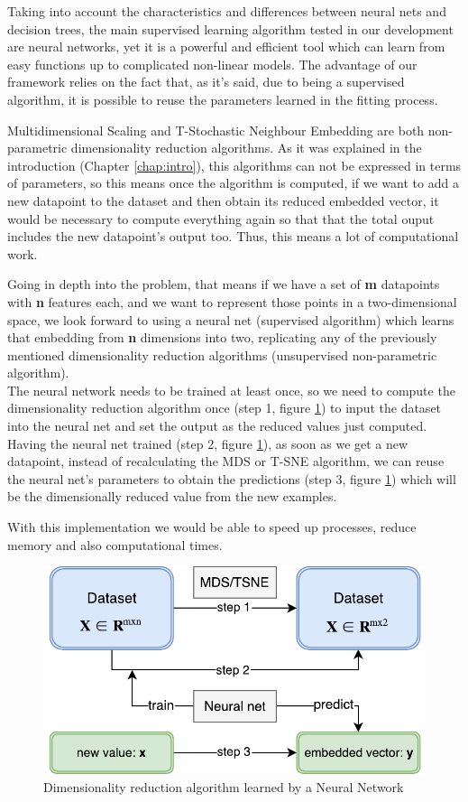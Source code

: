\documentclass[a4paper,11pt,spanish]{report}
\begin{document}
Taking into account the characteristics and differences between neural nets and decision trees, the main supervised learning algorithm tested in our development are neural networks, yet it is a powerful and efficient tool which can learn from easy functions up to complicated non-linear models. The advantage of our framework relies on the fact that, as it's said, due to being a supervised algorithm, it is possible to reuse the parameters learned in the fitting process.

Multidimensional Scaling and T-Stochastic Neighbour Embedding are both non-parametric dimensionality reduction algorithms. As it was explained in the introduction (Chapter \ref{chap:intro}), this algorithms can not be expressed in terms of parameters, so this means once the algorithm is computed, if we want to add a new datapoint to the dataset and then obtain its reduced embedded vector, it would be necessary to compute everything again so that that the total ouput includes the new datapoint's output too. Thus, this means a lot of computational work.

Going in depth into the problem, that means if we have a set of \textbf{m} datapoints with \textbf{n} features each, and we want to represent those points in a two-dimensional space, we look forward to using a neural net (supervised algorithm) which learns that embedding from \textbf{n} dimensions into two, replicating any of the previously mentioned dimensionality reduction algorithms (unsupervised non-parametric algorithm).\\ The neural network needs to be trained at least once, so we need to compute the dimensionality reduction algorithm once (step 1, figure \ref{figurenet}) to input the dataset into the neural net and set the output as the reduced values just computed. Having the neural net trained (step 2, figure \ref{figurenet}), as soon as we get a new datapoint, instead of recalculating the MDS or T-SNE algorithm, we can reuse the neural net's parameters to obtain the predictions (step 3, figure \ref{figurenet}) which will be the dimensionally reduced value from the new examples.

With this implementation we would be able to speed up processes, reduce memory and also computational times.\\

\begin{figure}[h]
\centering
\includegraphics[width=12cm]{figures/neuralnet.pdf}
\caption{\label{figurenet}Dimensionality reduction algorithm learned by a Neural Network}
\end{figure}
\end{document}
